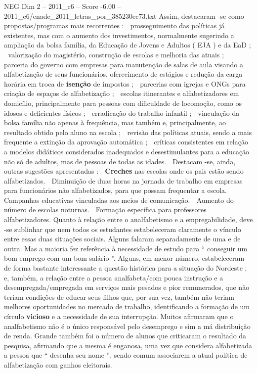 \begin{textsample}{NEG Dim 2 – 2011\_c6 – Score -6.00 – 2011\_c6/enade\_2011\_letras\_por\_385230ec73.txt}
Assim, destacaram -se como propostas/programas mais recorrentes :  prosseguimento das políticas já existentes, mas com o aumento dos investimentos, normalmente sugerindo a ampliação da bolsa família, da Educação de Jovens e Adultos ( EJA ) e da EaD ;  valorização do magistério, construção de escolas e melhoria das atuais ;  parceria do governo com empresas para manutenção de salas de aula visando a alfabetização de seus funcionários, oferecimento de estágios e redução da carga horária em troca de \textbf{isenção} de impostos ;  parcerias com igrejas e ONGs para criação de espaços de alfabetização ;  escolas itinerantes e alfabetizadores em domicílio, principalmente para pessoas com dificuldade de locomoção, como os idosos e deficientes físicos ;  erradicação do trabalho infantil ;  vinculação da bolsa família não apenas à frequência, mas também e, principalmente, ao resultado obtido pelo aluno na escola ;  revisão das políticas atuais, sendo a mais frequente a extinção da aprovação automática ;  críticas consistentes em relação a modelos didáticos considerados inadequados e desestimulantes para a educação não só de adultos, mas de pessoas de todas as idades.  Destacam -se, ainda, outras sugestões apresentadas :  \textbf{Creches} nas escolas onde os pais estão sendo alfabetizados.  Diminuição de duas horas na jornada de trabalho em empresas para funcionários não alfabetizados, para que possam frequentar a escola.  Campanhas educativas vinculadas aos meios de comunicação.  Aumento do número de escolas noturnas.  Formação específica para professores alfabetizadores.
Quanto à relação entre o analfabetismo e a empregabilidade, deve -se sublinhar que nem todos os estudantes estabeleceram claramente o vínculo entre essas duas situações sociais.
Alguns falaram separadamente de uma e de outra.
Mas a maioria fez referência à necessidade de estudo para “ conseguir um bom emprego com um bom salário ”.
Alguns, em menor número, estabeleceram de forma bastante interessante a questão histórica para a situação do Nordeste ; e, também, a relação entre a pessoa analfabeta/com pouca instrução e a desempregada/empregada em serviços mais pesados e pior remunerados, que não teriam condições de educar seus filhos que, por sua vez, também não teriam melhores oportunidades no mercado de trabalho, identificando a formação de um círculo \textbf{vicioso} e a necessidade de sua interrupção.
Muitos afirmaram que o analfabetismo não é o único responsável pelo desemprego e sim a má distribuição de renda.
Grande também foi o número de alunos que criticaram o resultado da pesquisa, afirmando que a mesma é enganosa, uma vez que considera alfabetizada a pessoa que “ desenha seu nome ”, sendo comum associarem a atual política de alfabetização com ganhos eleitorais.

\end{textsample}

